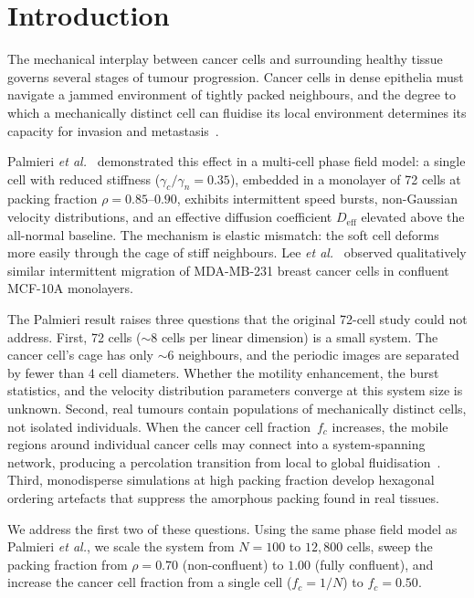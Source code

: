 \documentclass[aps,pre,twocolumn,superscriptaddress,longbibliography,floatfix]{revtex4-2}
\newcommand{\Deff}{D_{\mathrm{eff}}}       %
\newcommand{\fc}{f_c}                      %
\begin{document}
\section{Introduction}
\label{sec:intro}

The mechanical interplay between cancer cells and surrounding healthy
tissue governs several stages of tumour progression.  Cancer cells in
dense epithelia must navigate a jammed environment of tightly packed
neighbours, and the degree to which a mechanically distinct cell can
fluidise its local environment determines its capacity for invasion
and metastasis~\cite{Park2015,Mongera2018,Grosser2021}.

Palmieri \textit{et al.}~\cite{Palmieri2015} demonstrated this effect
in a multi-cell phase field model: a single cell with reduced
stiffness ($\gamma_c / \gamma_n = 0.35$), embedded in a monolayer of
72 cells at packing fraction $\rho = 0.85$--$0.90$, exhibits
intermittent speed bursts, non-Gaussian velocity distributions, and an
effective diffusion coefficient $\Deff$ elevated above the all-normal
baseline.  The mechanism is elastic mismatch: the soft cell deforms
more easily through the cage of stiff neighbours.  Lee
\textit{et al.}~\cite{Lee2012} observed qualitatively similar
intermittent migration of MDA-MB-231 breast cancer cells in confluent
MCF-10A monolayers.

The Palmieri result raises three questions that the original 72-cell
study could not address.  First, 72 cells ($\sim 8$ cells per linear
dimension) is a small system.  The cancer cell's cage has only $\sim
6$ neighbours, and the periodic images are separated by fewer than 4
cell diameters.  Whether the motility enhancement, the burst
statistics, and the velocity distribution parameters converge at this
system size is unknown.  Second, real tumours contain populations of
mechanically distinct cells, not isolated individuals.  When the
cancer cell fraction~$\fc$ increases, the mobile regions around
individual cancer cells may connect into a system-spanning network,
producing a percolation transition from local to global
fluidisation~\cite{Angelini2011}.  Third, monodisperse simulations
at high packing fraction develop hexagonal ordering artefacts that
suppress the amorphous packing found in real tissues.

We address the first two of these questions.  Using the same phase
field model as Palmieri \textit{et al.}, we scale the system from
$N = 100$ to $12{,}800$ cells, sweep the packing fraction from
$\rho = 0.70$ (non-confluent) to $1.00$ (fully confluent), and
increase the cancer cell fraction from a single cell ($\fc = 1/N$)
to $\fc = 0.50$.
\end{document}

